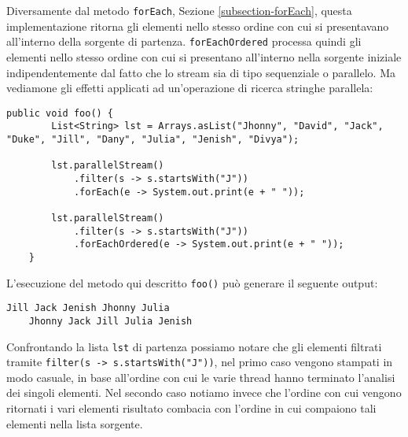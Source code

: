 			Diversamente dal metodo \lstinline|forEach|, Sezione \ref{subsection-forEach}, questa implementazione ritorna gli elementi nello stesso ordine con cui si presentavano all'interno della sorgente di partenza. \lstinline|forEachOrdered| processa quindi gli elementi nello stesso ordine con cui si presentano all'interno nella sorgente iniziale indipendentemente dal fatto che lo stream sia di tipo sequenziale o parallelo. Ma vediamone gli effetti applicati ad un'operazione di ricerca stringhe parallela:
			\begin{lstlisting}[breaklines=true]
	public void foo() {
		List<String> lst = Arrays.asList("Jhonny", "David", "Jack", "Duke", "Jill", "Dany", "Julia", "Jenish", "Divya");
			
		lst.parallelStream()
			.filter(s -> s.startsWith("J"))
			.forEach(e -> System.out.print(e + " "));
		
		lst.parallelStream()
			.filter(s -> s.startsWith("J"))
			.forEachOrdered(e -> System.out.print(e + " "));
	}
			\end{lstlisting}
			L'esecuzione del metodo qui descritto \lstinline|foo()| può generare il seguente output:
			\begin{lstlisting}[numbers=none,frame=none]
	Jill Jack Jenish Jhonny Julia 
	Jhonny Jack Jill Julia Jenish 
			\end{lstlisting}
			Confrontando la lista \lstinline|lst| di partenza possiamo notare che gli elementi filtrati tramite \lstinline|filter(s -> s.startsWith("J"))|, nel primo caso vengono stampati in modo casuale, in base all'ordine con cui le varie thread hanno terminato l'analisi dei singoli elementi. Nel secondo caso notiamo invece che l'ordine con cui vengono ritornati i vari elementi risultato combacia con l'ordine in cui compaiono tali elementi nella lista sorgente. 
			
